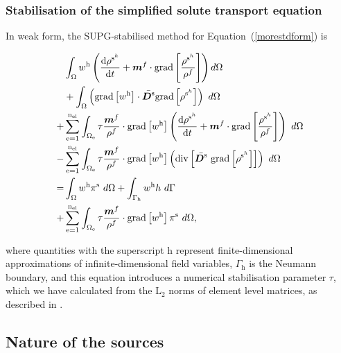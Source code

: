 \subsubsection{Stabilisation of the simplified solute transport
equation}\label{solutetranspstab}

In weak form, the SUPG-stabilised method for
Equation~(\ref{morestdform}) is

\begin{equation}
\begin{split}
&\int_{\Omega} w^{\mathrm{h}} \left(
  \frac{\mathrm{d}\rho^{\mathrm{s}^{h}}}{\mathrm{d}t} +
  \mbox{\boldmath$ m$}^f\cdot\mathrm{grad}\left[\frac{
      \rho^{\mathrm{s}^{h}}}{\rho^f}\right] \right)
  d\Omega\\ &+\int_{\Omega} \left( \mathrm{grad}
  \left[w^{\mathrm{h}}\right] \cdot \bar{\mbox{\boldmath$ D$}^\mathrm{s}} \mathrm{grad}
  \left[ \rho^{\mathrm{s}^{h}}\right] \right)\ d\Omega\\ +&
  \sum_{\mathrm{e}=1}^{\mathrm{n_{el}}} \int_{\Omega_{\mathrm{e}}}
  \tau \frac{\mbox{\boldmath$ m$}^{f}}{\rho^f} \cdot \mathrm{grad} \left[w^{\mathrm{h}}\right] \left(
  \frac{\mathrm{d}\rho^{\mathrm{s}^{h}}}{\mathrm{d}t} +
  \mbox{\boldmath$ m$}^f\cdot\mathrm{grad}\left[\frac{
      \rho^{\mathrm{s}^{h}}}{\rho^f}\right] \right) \ d\Omega\\ -&
  \sum_{\mathrm{e}=1}^{\mathrm{n_{el}}} \int_{\Omega_{\mathrm{e}}}
  \tau \frac{\mbox{\boldmath$ m$}^{f}}{\rho^f} \cdot \mathrm{grad} \left[w^{\mathrm{h}}\right]
  \left(\mathrm{div}\left[\bar{\mbox{\boldmath$ D$}^\mathrm{s}}\ \mathrm{grad} \left[
      \rho^{\mathrm{s}^{h}}\right]\right]\right) \ d\Omega\\ = &
  \int_{\Omega} w^{\mathrm{h}} \pi^\mathrm{s} \ d\Omega +
  \int_{\Gamma_{\mathrm{h}}} w^{\mathrm{h}} h \ d\Gamma\\ +&
  \sum_{\mathrm{e}=1}^{\mathrm{n_{el}}} \int_{\Omega_{\mathrm{e}}}
  \tau \frac{\mbox{\boldmath$ m$}^{f}}{\rho^f} \cdot \mathrm{grad} \left[w^{\mathrm{h}}\right]
  \pi^\mathrm{s} \ d\Omega,
\label{stabilizedmassbal}
\end{split}
\end{equation}

\noindent where quantities with the superscript $\mathrm{h}$ represent
finite-di\-men\-sion\-al approximations of infinite-dimensional field
variables, $\Gamma_{\mathrm{h}}$ is the Neumann boundary, and 
this equation introduces a numerical stabilisation parameter $\tau$,
which we have calculated from the $\mathrm{L}_{2}$ norms of element
level matrices, as described in
\cite{tezduyarsupg}.

\subsection{Nature of the sources}
\label{sources}

